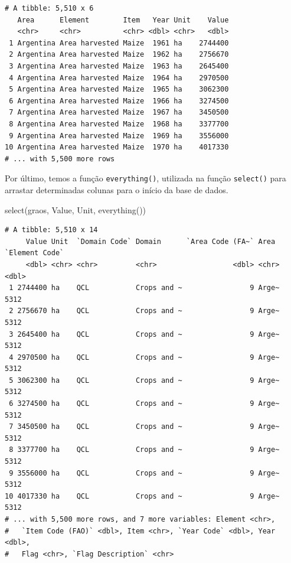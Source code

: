 \documentclass[
  brazilian,
]{book}
\newenvironment{Shaded}{\begin{snugshade}}{\end{snugshade}}
\newcommand{\FunctionTok}[1]{\textcolor[rgb]{0.00,0.00,0.00}{#1}}
\newcommand{\NormalTok}[1]{#1}
\begin{document}
\begin{verbatim}
# A tibble: 5,510 x 6
   Area      Element        Item   Year Unit    Value
   <chr>     <chr>          <chr> <dbl> <chr>   <dbl>
 1 Argentina Area harvested Maize  1961 ha    2744400
 2 Argentina Area harvested Maize  1962 ha    2756670
 3 Argentina Area harvested Maize  1963 ha    2645400
 4 Argentina Area harvested Maize  1964 ha    2970500
 5 Argentina Area harvested Maize  1965 ha    3062300
 6 Argentina Area harvested Maize  1966 ha    3274500
 7 Argentina Area harvested Maize  1967 ha    3450500
 8 Argentina Area harvested Maize  1968 ha    3377700
 9 Argentina Area harvested Maize  1969 ha    3556000
10 Argentina Area harvested Maize  1970 ha    4017330
# ... with 5,500 more rows
\end{verbatim}

Por último, temos a função \texttt{everything()}, utilizada na função \texttt{select()} para arrastar determinadas colunas para o início da base de dados.

\begin{Shaded}
\begin{Highlighting}[]
\FunctionTok{select}\NormalTok{(graos, }
\NormalTok{       Value, Unit, }\FunctionTok{everything}\NormalTok{())}
\end{Highlighting}
\end{Shaded}

\begin{verbatim}
# A tibble: 5,510 x 14
     Value Unit  `Domain Code` Domain      `Area Code (FA~` Area  `Element Code`
     <dbl> <chr> <chr>         <chr>                  <dbl> <chr>          <dbl>
 1 2744400 ha    QCL           Crops and ~                9 Arge~           5312
 2 2756670 ha    QCL           Crops and ~                9 Arge~           5312
 3 2645400 ha    QCL           Crops and ~                9 Arge~           5312
 4 2970500 ha    QCL           Crops and ~                9 Arge~           5312
 5 3062300 ha    QCL           Crops and ~                9 Arge~           5312
 6 3274500 ha    QCL           Crops and ~                9 Arge~           5312
 7 3450500 ha    QCL           Crops and ~                9 Arge~           5312
 8 3377700 ha    QCL           Crops and ~                9 Arge~           5312
 9 3556000 ha    QCL           Crops and ~                9 Arge~           5312
10 4017330 ha    QCL           Crops and ~                9 Arge~           5312
# ... with 5,500 more rows, and 7 more variables: Element <chr>,
#   `Item Code (FAO)` <dbl>, Item <chr>, `Year Code` <dbl>, Year <dbl>,
#   Flag <chr>, `Flag Description` <chr>
\end{verbatim}
\end{document}
